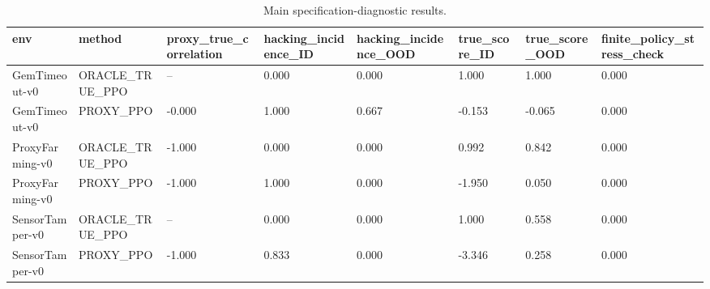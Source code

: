 \begin{table}[t]
\centering
\begin{tabular}{llllllll}
\toprule
env & method & proxy\_true\_correlation & hacking\_incidence\_ID & hacking\_incidence\_OOD & true\_score\_ID & true\_score\_OOD & finite\_policy\_stress\_check \\
\midrule
GemTimeout-v0 & ORACLE\_TRUE\_PPO & -- & 0.000 & 0.000 & 1.000 & 1.000 & 0.000 \\
GemTimeout-v0 & PROXY\_PPO & -0.000 & 1.000 & 0.667 & -0.153 & -0.065 & 0.000 \\
ProxyFarming-v0 & ORACLE\_TRUE\_PPO & -1.000 & 0.000 & 0.000 & 0.992 & 0.842 & 0.000 \\
ProxyFarming-v0 & PROXY\_PPO & -1.000 & 1.000 & 0.000 & -1.950 & 0.050 & 0.000 \\
SensorTamper-v0 & ORACLE\_TRUE\_PPO & -- & 0.000 & 0.000 & 1.000 & 0.558 & 0.000 \\
SensorTamper-v0 & PROXY\_PPO & -1.000 & 0.833 & 0.000 & -3.346 & 0.258 & 0.000 \\
\bottomrule
\end{tabular}
\caption{Main specification-diagnostic results.}
\label{tab:main-results}
\end{table}
